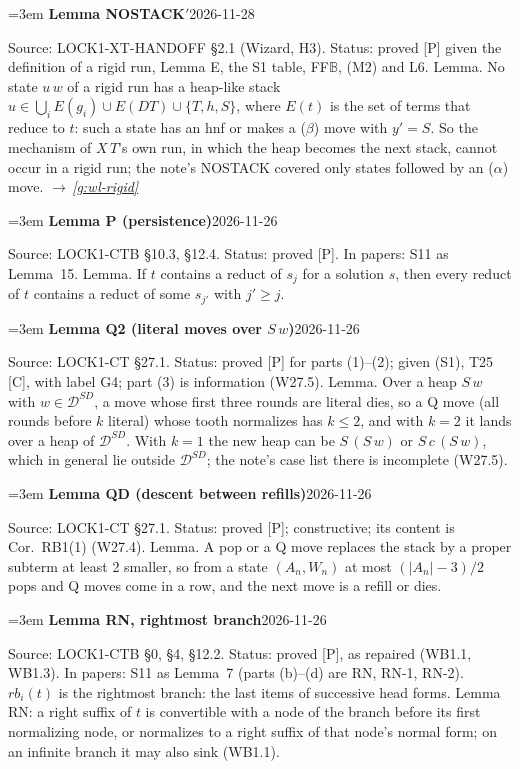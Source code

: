 \documentclass[11pt]{amsart}
\makeatletter
\newcommand{\sz}[1]{\lvert#1\rvert}
\newcounter{sense}
\newenvironment{entry}[3]{%
  \par\addvspace{\medskipamount}\noindent\phantomsection
  \def\@currentlabel{#2}\label{#1}\setcounter{sense}{0}\raggedright\emergencystretch=3em%
  \textbf{#2}\hfill{\footnotesize\textsf{#3}}\par\nopagebreak\noindent\ignorespaces}%
  {\par}
\newcommand{\src}[1]{\textsf{Source:} #1.\enskip}
\newcommand{\status}[1]{\textsf{Status:} #1.\enskip}
\newcommand{\appears}[1]{\textsf{In papers:} #1.\enskip}
\renewcommand{\see}[1]{$\rightarrow$\,\emph{\ref{#1}}}
\makeatother
\begin{document}
\begin{entry}{g:wl-nostack}{Lemma NOSTACK$'$}{2026-11-28}
\src{LOCK1-XT-HANDOFF \S2.1 (Wizard, H3)}
\status{proved [P] given the definition of a rigid run, Lemma E, the S1 table, FF$\mathbb B$, (M2) and L6}
Lemma. No state $u\,w$ of a rigid run has a heap-like stack $u\in\bigcup_iE(g_i)\cup E(DT)\cup\{T,h,S\}$,
where $E(t)$ is the set of terms that reduce to $t$: such a state has an hnf or makes a ($\beta$) move
with $y'=S$. So the mechanism of $X\,T$'s own run, in which the heap becomes the next stack, cannot
occur in a rigid run; the note's NOSTACK covered only states followed by an ($\alpha$) move.
\see{g:wl-rigid}
\end{entry}

\begin{entry}{g:wl-lemma-p}{Lemma P (persistence)}{2026-11-26}
\src{LOCK1-CTB \S10.3, \S12.4}
\status{proved [P]}
\appears{S11 as Lemma~15}
Lemma. If $t$ contains a reduct of $s_j$ for a solution $s$, then every reduct of $t$ contains a
reduct of some $s_{j'}$ with $j'\ge j$.
\end{entry}

\begin{entry}{g:wl-q2}{Lemma Q2 (literal moves over $S\,w$)}{2026-11-26}
\src{LOCK1-CT \S27.1}
\status{proved [P] for parts (1)--(2); given (S1), T25 [C], with label G4; part (3) is information
(W27.5)}
Lemma. Over a heap $S\,w$ with $w\in\mathcal D^{SD}$, a move whose first three rounds are literal dies,
so a Q move (all rounds before $k$ literal) whose tooth normalizes has $k\le2$, and with $k=2$ it lands
over a heap of $\mathcal D^{SD}$. With $k=1$ the new heap can be $S\,(S\,w)$ or $S\,c\,(S\,w)$, which in
general lie outside $\mathcal D^{SD}$; the note's case list there is incomplete (W27.5).
\end{entry}

\begin{entry}{g:wl-qd}{Lemma QD (descent between refills)}{2026-11-26}
\src{LOCK1-CT \S27.1}
\status{proved [P]; constructive; its content is Cor.~RB1(1) (W27.4)}
Lemma. A pop or a Q move replaces the stack by a proper subterm at least 2 smaller, so from a state
$(A_n,W_n)$ at most $(\sz{A_n}-3)/2$ pops and Q moves come in a row, and the next move is a refill or
dies.
\end{entry}

\begin{entry}{g:wl-rn}{Lemma RN, rightmost branch}{2026-11-26}
\src{LOCK1-CTB \S0, \S4, \S12.2}
\status{proved [P], as repaired (WB1.1, WB1.3)}
\appears{S11 as Lemma~7 (parts (b)--(d) are RN, RN-1, RN-2)}
$rb_i(t)$ is the rightmost branch: the last items of successive head forms. Lemma RN: a right suffix
of $t$ is convertible with a node of the branch before its first normalizing node, or normalizes to a
right suffix of that node's normal form; on an infinite branch it may also sink (WB1.1).
\end{entry}
\end{document}
